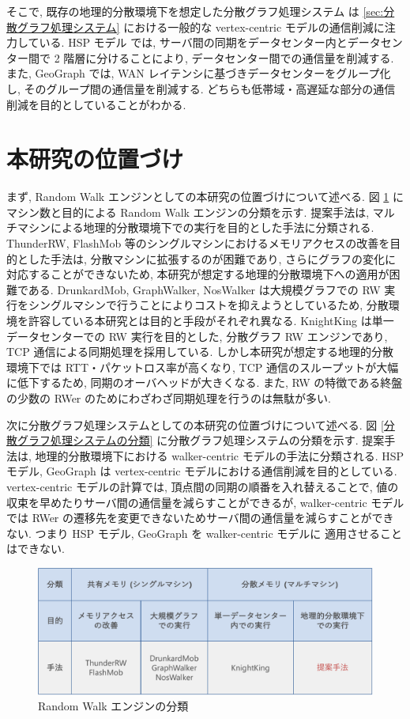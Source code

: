 そこで, 既存の地理的分散環境下を想定した分散グラフ処理システム\cite{10.5555/3277180.3277185}\cite{8486361}\cite{10.1145/3397271.3401157} は \ref{sec:分散グラフ処理システム} における一般的な vertex-centric モデルの通信削減に注力している. HSP モデル\cite{8486361} では, サーバ間の同期をデータセンター内とデータセンター間で 2 階層に分けることにより, データセンター間での通信量を削減する. また, GeoGraph\cite{10.1145/3397271.3401157} では, WAN レイテンシに基づきデータセンターをグループ化し, そのグループ間の通信量を削減する. どちらも低帯域・高遅延な部分の通信削減を目的としていることがわかる. 

\section{本研究の位置づけ}

まず, Random Walk エンジンとしての本研究の位置づけについて述べる. 図 \ref{Random Walk エンジンの分類} にマシン数と目的による Random Walk エンジンの分類を示す. 提案手法は, マルチマシンによる地理的分散環境下での実行を目的とした手法に分類される. ThunderRW, FlashMob 等のシングルマシンにおけるメモリアクセスの改善を目的とした手法は, 分散マシンに拡張するのが困難であり, さらにグラフの変化に対応することができないため, 本研究が想定する地理的分散環境下への適用が困難である. DrunkardMob, GraphWalker, NosWalker は大規模グラフでの RW 実行をシングルマシンで行うことによりコストを抑えようとしているため, 分散環境を許容している本研究とは目的と手段がそれぞれ異なる. KnightKing は単一データセンターでの RW 実行を目的とした, 分散グラフ RW エンジンであり, TCP 通信による同期処理を採用している. しかし本研究が想定する地理的分散環境下では RTT・パケットロス率が高くなり, TCP 通信のスループットが大幅に低下するため, 同期のオーバヘッドが大きくなる. また, RW の特徴である終盤の少数の RWer のためにわざわざ同期処理を行うのは無駄が多い. 

次に分散グラフ処理システムとしての本研究の位置づけについて述べる. 図 \ref{分散グラフ処理システムの分類} に分散グラフ処理システムの分類を示す. 提案手法は, 地理的分散環境下における walker-centric モデルの手法に分類される. HSP モデル, GeoGraph は vertex-centric モデルにおける通信削減を目的としている. vertex-centric モデルの計算では, 頂点間の同期の順番を入れ替えることで, 値の収束を早めたりサーバ間の通信量を減らすことができるが, walker-centric モデルでは RWer の遷移先を変更できないためサーバ間の通信量を減らすことができない. つまり HSP モデル, GeoGraph を walker-centric モデルに 適用させることはできない. 

\begin{figure}[t]
    \centering
    \includegraphics[scale=0.5]{figure/RWEngine.pdf}
    \caption{Random Walk エンジンの分類}
    \label{Random Walk エンジンの分類}
\end{figure}

